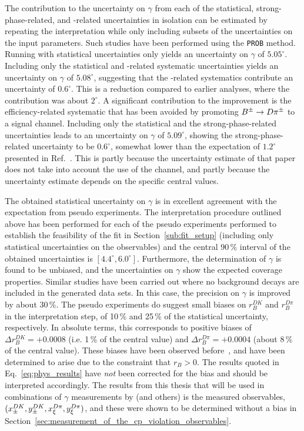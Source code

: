 The contribution to the uncertainty on $\gamma$ from each of the statistical, strong-phase-related, and \lhcb-related uncertainties in isolation can be estimated by repeating the interpretation while only including subsets of the uncertainties on the input parameters. Such studies have been performed using the \texttt{PROB} method. Running with statistical uncertainties only yields an uncertainty on $\gamma$ of $5.05^\circ$. Including only the statistical and \lhcb-related systematic uncertainties yields an uncertainty on $\gamma$ of $5.08^\circ$, suggesting that the \lhcb-related systematics  contribute an uncertainty of $0.6^\circ$. This is a reduction compared to earlier analyses, where the contribution was about $2^\circ$. A significant contribution to the improvement is the efficiency-related systematic that has been avoided by promoting ${{{B}^\pm}\rightarrow{\ensuremath{D}}{\ensuremath{{\pi}^\pm}}}$ to a signal channel. Including only the statistical and the strong-phase-related uncertainties leads to an uncertainty on $\gamma$ of $5.09^\circ$, showing the strong-phase-related uncertainty to be $0.6^\circ$, somewhat lower than the expectation of $1.2^\circ$  presented in Ref.~\cite{BESCISI}. This is partly because the uncertainty estimate of that paper does not take into account the use of the \DtoKsKK channel, and partly because the uncertainty estimate depends on the specific central values.

The obtained statistical uncertainty on $\gamma$ is in excellent agreement with the expectation from pseudo experiments. The interpretation procedure outlined above has been performed for each of the pseudo experiments performed to establish the feasibility of the \CP fit in Section~\ref{sub:fit_setup} (including only statistical uncertainties on the observables) and the central 90\,\% interval of the obtained uncertainties is $[4.4^\circ, 6.0^\circ]$. Furthermore, the determination of $\gamma$ is found to be unbiased, and the uncertainties on $\gamma$ show the expected coverage properties. Similar studies have been carried out where no background decays are included in the generated data sets. In this case, the precision on $\gamma$ is improved by about 30\,\%. The pseudo experiments do suggest small biases on $r_B^{DK}$ and $r_B^{D\pi}$ in the interpretation step, of 10\,\% and 25\,\% of the statistical uncertainty, respectively. In absolute terms, this corresponds to positive biases of $\Delta r_B^{DK} = +0.0008$ (i.e. 1\,\% of the central value) and $\Delta r_B^{D\pi} = +0.0004$ (about 8\,\% of the central value). These biases have been observed before~\cite{LHCb-PAPER-2016-032}, and have been determined to arise due to the constraint that $r_B>0$.  The results quoted in Eq.~\eqref{eq:phys_results} have \emph{not} been corrected for the bias and should be interpreted accordingly. The results from this thesis that will be used in combinations of $\gamma$ measurements by \lhcb (and others) is the measured observables, $(x_\pm^{{D}{K}}, y_\pm^{{D}{K}}, x_\xi^{{D}\pi}, y_\xi^{{D}\pi})$,  and these were shown to be determined without a bias in Section~\ref{sec:measurement_of_the_cp_violation_observables}.

